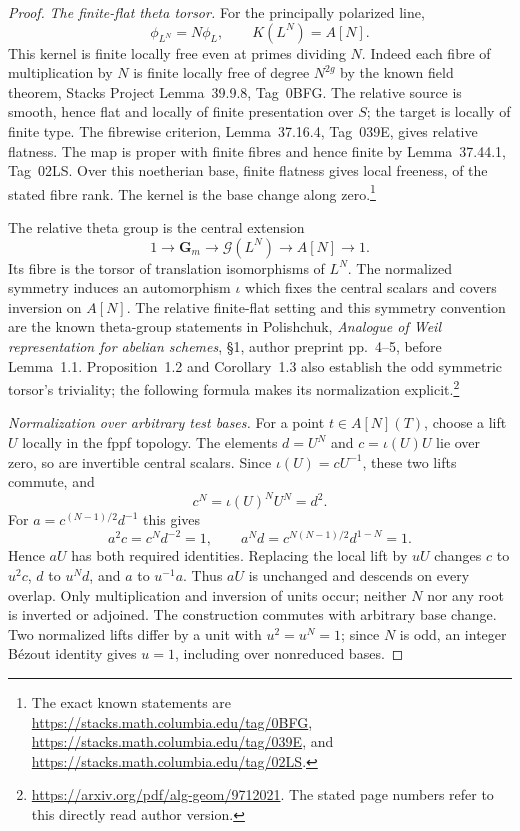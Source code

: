 \begin{proof}
\emph{The finite-flat theta torsor.}
For the principally polarized line,
\[
 \phi_{L^N}=N\phi_L,\qquad K(L^N)=A[N].
\]
This kernel is finite locally free even at primes dividing $N$.
Indeed each fibre of multiplication by $N$ is finite locally free of degree $N^{2g}$ by the known field theorem, Stacks Project Lemma~39.9.8, Tag~0BFG.
The relative source is smooth, hence flat and locally of finite presentation over $S$; the target is locally of finite type.
The fibrewise criterion, Lemma~37.16.4, Tag~039E, gives relative flatness.
The map is proper with finite fibres and hence finite by Lemma~37.44.1, Tag~02LS.
Over this noetherian base, finite flatness gives local freeness, of the stated fibre rank.
The kernel is the base change along zero.\footnote{The exact known statements are \url{https://stacks.math.columbia.edu/tag/0BFG}, \url{https://stacks.math.columbia.edu/tag/039E}, and \url{https://stacks.math.columbia.edu/tag/02LS}.}

The relative theta group is the central extension
\[
 1\longrightarrow\mathbf G_m\longrightarrow
 \mathcal G(L^N)\longrightarrow A[N]\longrightarrow1.
\]
Its fibre is the torsor of translation isomorphisms of $L^N$.
The normalized symmetry induces an automorphism $\iota$ which fixes the central scalars and covers inversion on $A[N]$.
The relative finite-flat setting and this symmetry convention are the known theta-group statements in Polishchuk, \emph{Analogue of Weil representation for abelian schemes}, \S1, author preprint pp.~4--5, before Lemma~1.1.
Proposition~1.2 and Corollary~1.3 also establish the odd symmetric torsor's triviality; the following formula makes its normalization explicit.\footnote{\url{https://arxiv.org/pdf/alg-geom/9712021}. The stated page numbers refer to this directly read author version.}

\emph{Normalization over arbitrary test bases.}
For a point $t\in A[N](T)$, choose a lift $U$ locally in the fppf topology.
The elements $d=U^N$ and $c=\iota(U)U$ lie over zero, so are invertible central scalars.
Since $\iota(U)=cU^{-1}$, these two lifts commute, and
\[
 c^N=\iota(U)^NU^N=d^2.
\]
For $a=c^{(N-1)/2}d^{-1}$ this gives
\[
 a^2c=c^Nd^{-2}=1,\qquad
 a^Nd=c^{N(N-1)/2}d^{1-N}=1.
\]
Hence $aU$ has both required identities.
Replacing the local lift by $uU$ changes $c$ to $u^2c$, $d$ to $u^Nd$, and $a$ to $u^{-1}a$.
Thus $aU$ is unchanged and descends on every overlap.
Only multiplication and inversion of units occur; neither $N$ nor any root is inverted or adjoined.
The construction commutes with arbitrary base change.
Two normalized lifts differ by a unit with $u^2=u^N=1$; since $N$ is odd, an integer B\'ezout identity gives $u=1$, including over nonreduced bases.


\end{proof}
